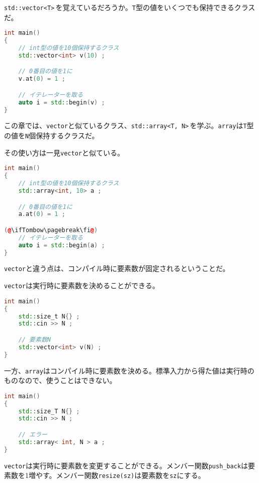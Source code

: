 
\texttt{std::vector<T>}\,を覚えているだろうか。\texttt{T}型の値をいくつでも保持できるクラスだ。

\begin{lstlisting}[language={C++}]
int main()
{
    // int型の値を10個保持するクラス
    std::vector<int> v(10) ;

    // 0番目の値を1に
    v.at(0) = 1 ;

    // イテレーターを取る
    auto i = std::begin(v) ;
}
\end{lstlisting}

この章では、\texttt{vector}と似ているクラス、\texttt{std::array<T, N>}\,を学ぶ。\texttt{array}は\texttt{T}型の値を\texttt{N}個保持するクラスだ。

その使い方は一見\texttt{vector}と似ている。

\begin{lstlisting}[language={C++}]
int main()
{
    // int型の値を10個保持するクラス
    std::array<int, 10> a ;

    // 0番目の値を1に
    a.at(0) = 1 ;

(@\ifTombow\pagebreak\fi@)
    // イテレーターを取る
    auto i = std::begin(a) ;
}
\end{lstlisting}

\texttt{vector}と違う点は、コンパイル時に要素数が固定されるということだ。

\texttt{vector}は実行時に要素数を決めることができる。

\begin{lstlisting}[language={C++}]
int main()
{
    std::size_t N{} ;
    std::cin >> N ;

    // 要素数N
    std::vector<int> v(N) ;
}
\end{lstlisting}

一方、\texttt{array}はコンパイル時に要素数を決める。標準入力から得た値は実行時のものなので、使うことはできない。

\begin{lstlisting}[language={C++}]
int main()
{
    std::size_T N{} ;
    std::cin >> N ;

    // エラー
    std::array< int, N > a ;
}
\end{lstlisting}

\texttt{vector}は実行時に要素数を変更することができる。メンバー関数\texttt{push\_back}は要素数を1増やす。メンバー関数\texttt{resize(sz)}は要素数を\texttt{sz}にする。

